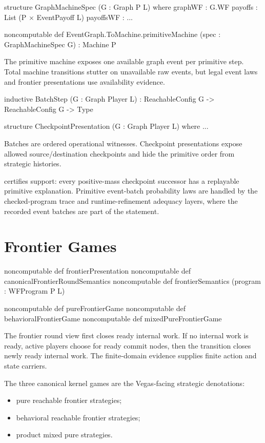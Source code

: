 \documentclass[11pt]{article}
\renewcommand{\TT}[1]{\texttt{\detokenize{#1}}}
\begin{document}
\begin{leanbox}
structure GraphMachineSpec (G : Graph P L) where
  graphWF  : G.WF
  payoffs  : List (P \(\times\) EventPayoff L)
  payoffsWF : ...

noncomputable def EventGraph.ToMachine.primitiveMachine
    (spec : GraphMachineSpec G) : Machine P
\end{leanbox}

The primitive machine exposes one available graph event per primitive
step.  Total machine transitions stutter on unavailable raw events, but
legal event laws and frontier presentations use availability evidence.

\begin{leanbox}
inductive BatchStep (G : Graph Player L) :
    ReachableConfig G -> ReachableConfig G -> Type

structure CheckpointPresentation (G : Graph Player L) where ...
\end{leanbox}

Batches are ordered operational witnesses.  Checkpoint presentations
expose allowed source/destination checkpoints and hide the primitive
order from strategic histories.

\TT{FrontierRoundSemantics} certifies support: every positive-mass
checkpoint successor has a replayable primitive explanation.  Primitive
event-batch probability laws are handled by the checked-program trace and
runtime-refinement adequacy layers, where the recorded event batches are
part of the statement.

\section{Frontier Games}

\begin{leanbox}
noncomputable def frontierPresentation
noncomputable def canonicalFrontierRoundSemantics
noncomputable def frontierSemantics (program : WFProgram P L)

noncomputable def pureFrontierGame
noncomputable def behavioralFrontierGame
noncomputable def mixedPureFrontierGame
\end{leanbox}

The frontier round view first closes ready internal work.  If no
internal work is ready, active players choose for ready commit nodes,
then the transition closes newly ready internal work.  The finite-domain
evidence supplies finite action and state carriers.

The three canonical kernel games are the Vegas-facing strategic
denotations:
\begin{itemize}\itemsep1pt
\item pure reachable frontier strategies;
\item behavioral reachable frontier strategies;
\item product mixed pure strategies.
\end{itemize}
\end{document}
